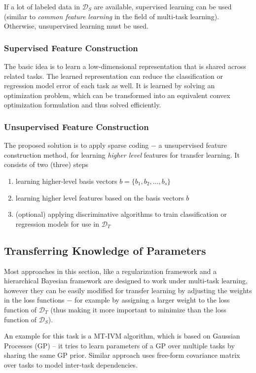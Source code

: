 \documentclass[a4paper,twocolumn]{article}
\newcommand{\D}{\mathcal{D}}
\begin{document}
If a lot of labeled data in $\D_S$ are available, supervised learning can be used (similar to \textit{common feature learning} in the field of multi-task learning).
Otherwise, unsupervised learning must be used.

\subsubsection{Supervised Feature Construction}
The basic idea is to learn a low-dimensional representation that is shared across related tasks. The learned representation can reduce the classification or regression model error of each task as well. It is learned by solving an optimization problem, which can be transformed into an equivalent convex optimization formulation and thus solved efficiently.
\subsubsection{Unsupervised Feature Construction}
The proposed solution is to apply sparse coding $-$ a unsupervised feature construction method, for learning \textit{higher level} features for transfer learning.
It consists of two (three) steps
\begin{enumerate}
    \item learning higher-level basis vectors $b = \{b_1, b_2, \ldots, b_s\}$
    \item learning higher level features based on the basis vectors $b$
    \item (optional) applying discriminative algorithms to train classification or regression models for use in $\D_T$
\end{enumerate}
\subsection{Transferring Knowledge of Parameters}
Most approaches in this section, like a regularization framework and a hierarchical Bayesian framework are designed to work under multi-task learning, however they can be easily modified for transfer learning by adjusting the weights in the loss functions $-$ for example by assigning a larger weight to the loss function of $\D_T$ (thus making it more important to minimize than the loss function of $\D_S$).

An example for this task is a MT-IVM algorithm, which is based on Gaussian Processes (GP) – it tries to learn parameters of a GP over multiple tasks by sharing the same GP prior.
Similar approach uses free-form covariance matrix over tasks to model inter-task dependencies.
\end{document}
